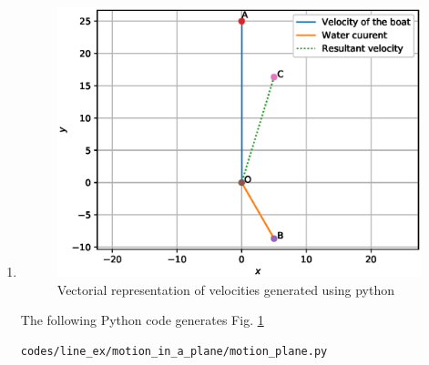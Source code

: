\begin{enumerate}
\item \begin{figure}[!ht]
\centering
\includegraphics[width=\columnwidth]{./figs/line_ex/motion_in_a_plane/motion_plane.eps}
\caption{Vectorial representation of velocities generated using python}
\label{fig:motion_plane_motion_in_a_plane}
\end{figure} 

The following Python code generates Fig. \ref{fig:motion_plane_motion_in_a_plane}

\begin{lstlisting}
codes/line_ex/motion_in_a_plane/motion_plane.py
\end{lstlisting}

\end{enumerate}
\pagebreak